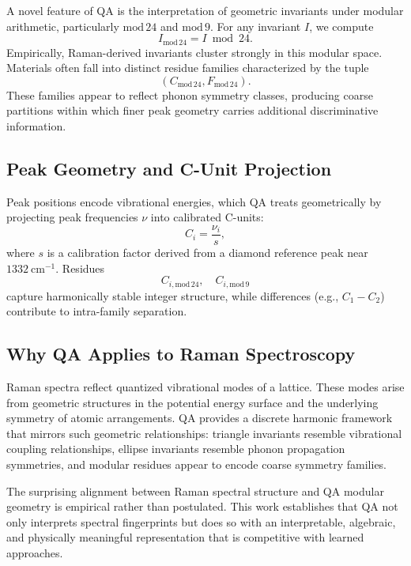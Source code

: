 \documentclass[12pt]{article}
\begin{document}
A novel feature of QA is the interpretation of geometric invariants under modular arithmetic, particularly
$\mathrm{mod}\,24$ and $\mathrm{mod}\,9$. For any invariant $I$, we compute
\[
I_{\mathrm{mod}\,24} = I \bmod 24.
\]
Empirically, Raman-derived invariants cluster strongly in this modular space. Materials often fall into
distinct residue families characterized by the tuple
\[
(C_{\mathrm{mod}\,24},F_{\mathrm{mod}\,24}).
\]
These families appear to reflect phonon symmetry classes, producing coarse partitions within which finer
peak geometry carries additional discriminative information.

\subsection{Peak Geometry and C-Unit Projection}

Peak positions encode vibrational energies, which QA treats geometrically by projecting peak frequencies
$\nu$ into calibrated C-units:
\[
C_i = \frac{\nu_i}{s},
\]
where $s$ is a calibration factor derived from a diamond reference peak near $1332\ \mathrm{cm^{-1}}$.
Residues
\[
C_{i,\mathrm{mod}\,24},\quad C_{i,\mathrm{mod}\,9}
\]
capture harmonically stable integer structure, while differences (e.g., $C_1 - C_2$) contribute to
intra-family separation.

\subsection{Why QA Applies to Raman Spectroscopy}

Raman spectra reflect quantized vibrational modes of a lattice. These modes arise from geometric structures
in the potential energy surface and the underlying symmetry of atomic arrangements. QA provides a discrete
harmonic framework that mirrors such geometric relationships: triangle invariants resemble vibrational 
coupling relationships, ellipse invariants resemble phonon propagation symmetries, and modular residues 
appear to encode coarse symmetry families. 

The surprising alignment between Raman spectral structure and QA modular geometry is empirical rather than
postulated. This work establishes that QA not only interprets spectral fingerprints but does so with an
interpretable, algebraic, and physically meaningful representation that is competitive with learned
approaches.
\end{document}

